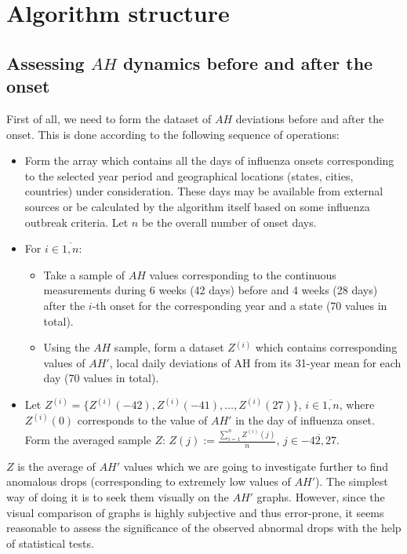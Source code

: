 \documentclass[procedia]{easychair}
\begin{document}
\section{Algorithm structure}

\subsection{Assessing $AH$ dynamics before and after the onset}

First of all, we need to form the dataset of $AH$ deviations before and after the onset. This is done according to the following sequence of operations:

\begin{itemize}
\item Form the array which contains all the days of influenza onsets corresponding to the selected year period and geographical locations (states, cities, countries) under consideration. These days may be available from external sources or be calculated by the algorithm itself based on some influenza outbreak criteria. Let $n$ be the overall number of onset days.

\item For $i \in \overline{1,n}$:
\begin{itemize}
\item Take a sample of $AH$ values corresponding to the continuous measurements during 6 weeks (42 days) before and 4 weeks (28 days) after the $i$-th onset for the corresponding year and a state (70 values in total).
\item Using the $AH$ sample, form a dataset $Z{^{(i)}}$ which contains corresponding values of $AH'$, local daily deviations of AH from its 31-year mean for each day (70 values in total).  
\end{itemize}

\item Let $Z^{(i)} = \{ Z^{(i)}(-42), Z^{(i)}(-41), \dots, Z^{(i)}(27)\}$, $i \in \overline{1,n}$, where $Z^{(i)}(0)$ corresponds to the value of $AH'$ in the day of influenza onset. Form the averaged sample $Z$: $Z(j) :=  \frac{\sum^{n}_{i=1} Z^{(i)}(j)}{n}$, $j \in \overline{-42,27}$. 
\end{itemize}

$Z$ is the average of $AH'$ values which we are going to investigate further to find anomalous drops (corresponding to extremely low values of $AH'$). The simplest way of doing it is to seek them visually on the $AH'$ graphs. However, since the visual comparison of graphs is highly subjective and thus error-prone, it seems reasonable to assess the significance of the observed abnormal drops with the help of statistical tests. 
\end{document}
